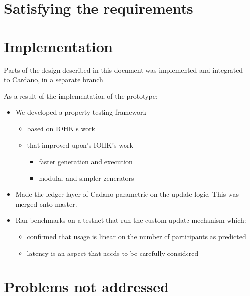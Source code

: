 \documentclass[11pt,a4paper]{article}
\begin{document}
\section{Satisfying the requirements}
\label{sec:satisfy-requ}



\section{Implementation}
\label{sec:implementation-1}

Parts of the design described in this document was implemented and integrated to Cardano,
in a separate branch.


As a result of the implementation of the prototype:
\begin{itemize}
\item We developed a property testing framework
  \begin{itemize}
  \item based on IOHK's work
  \item that improved upon's IOHK's work
    \begin{itemize}
    \item faster generation and execution
    \item modular and simpler generators
    \end{itemize}
  \end{itemize}
\item Made the ledger layer of Cadano parametric on the update logic. This was
  merged onto master.
\item Ran benchmarks on a testnet that run the custom update mechanism which:
  \begin{itemize}
  \item confirmed that usage is linear on the number of participants as predicted
  \item latency is an aspect that needs to be carefully considered
  \end{itemize}
\end{itemize}


\section{Problems not addressed}
\label{sec:probl-not-addr}
\end{document}
